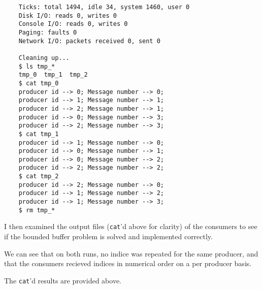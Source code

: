 \documentclass[11pt]{article}
\begin{document}
\begin{question}
\begin{subquestion}
\begin{itemize}
{\begin{verbatim}
    Ticks: total 1494, idle 34, system 1460, user 0
    Disk I/O: reads 0, writes 0
    Console I/O: reads 0, writes 0
    Paging: faults 0
    Network I/O: packets received 0, sent 0

    Cleaning up...
    $ ls tmp_*
    tmp_0  tmp_1  tmp_2
    $ cat tmp_0
    producer id --> 0; Message number --> 0;
    producer id --> 1; Message number --> 1;
    producer id --> 2; Message number --> 1;
    producer id --> 0; Message number --> 3;
    producer id --> 2; Message number --> 3;
    $ cat tmp_1
    producer id --> 1; Message number --> 0;
    producer id --> 0; Message number --> 1;
    producer id --> 0; Message number --> 2;
    producer id --> 2; Message number --> 2;
    $ cat tmp_2
    producer id --> 2; Message number --> 0;
    producer id --> 1; Message number --> 2;
    producer id --> 1; Message number --> 3;
    $ rm tmp_*
                \end{verbatim}
            }
        \end{itemize}

    \end{subquestion}
    \begin{subquestion}
        I then examined the output files ({\tt cat}'d above for clarity) of the consumers to see if the bounded buffer problem is solved and implemented correctly.

        We can see that on both runs, no indice was repeated for the same producer, and that the consumers recieved indices in numerical order on a per producer basis.
    \end{subquestion}
    \begin{subquestion}
        The {\tt cat}'d results are provided above.
    \end{subquestion}
    \end{question}
\end{document}
